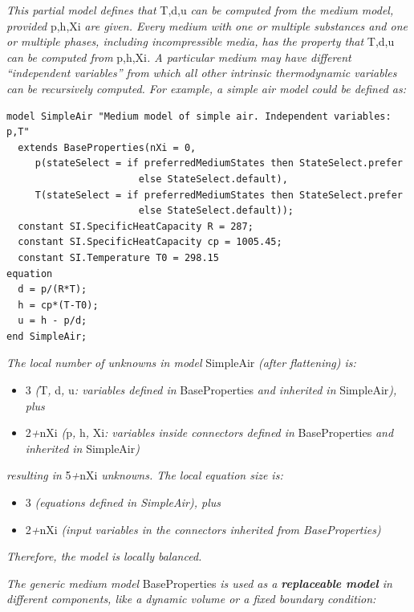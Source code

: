 \documentclass[10pt,a4paper]{report}
\begin{document}
\emph{This partial model defines that} T,d,u \emph{can be computed from
the medium model, provided} p,h,Xi \emph{are given. Every medium with
one or multiple substances and one or multiple phases, including
incompressible media, has the property that} T,d,u \emph{can be computed
from} p,h,Xi\emph{. A particular medium may have different ``independent
variables'' from which all other intrinsic thermodynamic variables can
be recursively computed. For example, a simple air model could be
defined as:}

\begin{lstlisting}[language=modelica]
model SimpleAir "Medium model of simple air. Independent variables: p,T"
  extends BaseProperties(nXi = 0,
     p(stateSelect = if preferredMediumStates then StateSelect.prefer
                       else StateSelect.default),
     T(stateSelect = if preferredMediumStates then StateSelect.prefer
                       else StateSelect.default));
  constant SI.SpecificHeatCapacity R = 287;
  constant SI.SpecificHeatCapacity cp = 1005.45;
  constant SI.Temperature T0 = 298.15
equation
  d = p/(R*T);
  h = cp*(T-T0);
  u = h - p/d;
end SimpleAir;
\end{lstlisting}

\emph{The local number of unknowns in model} SimpleAir \emph{(after
flattening) is:}

\begin{itemize}
\item
  3 \emph{(}T\emph{,} d\emph{,} u\emph{: variables defined in}
  BaseProperties \emph{and inherited in} SimpleAir\emph{), plus}
\item
  2\emph{+}nXi \emph{(}p\emph{,} h\emph{,} Xi\emph{: variables inside
  connectors defined in} BaseProperties \emph{and inherited in}
  SimpleAir\emph{)}
\end{itemize}

\emph{resulting in} 5\emph{+}nXi \emph{unknowns. The local equation size
is:}

\begin{itemize}
\item
  3 \emph{(equations defined in SimpleAir), plus}
\item
  2\emph{+}nXi \emph{(input variables in the connectors inherited from
  BaseProperties)}
\end{itemize}

\emph{Therefore, the model is locally balanced. }

\emph{The generic medium model} BaseProperties \emph{is used as a
\textbf{replaceable model} in different components, like a dynamic
volume or a fixed boundary condition:}
\end{document}
